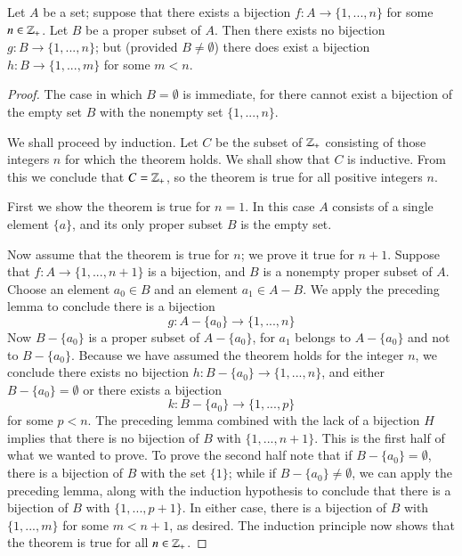 \documentclass[12pt, a4paper, oneside, openright, titlepage]{book}
\begin{document}
\begin{appendices}
    \begin{thm}
        Let $A$ be a set; suppose that there exists a bijection $f:A\rightarrow \{1,...,n\}$ for some $n \in \mathbb Z_+$. Let $B$ be a proper subset of $A$. Then there exists no bijection $g:B\rightarrow \{1,...,n\}$; but (provided $B\neq \emptyset$) there does exist a bijection $h:B\rightarrow \{1,...,m\}$ for some $m < n$.
    \end{thm}
    \begin{proof}
        The case in which $B = \emptyset$ is immediate, for there cannot exist a bijection of the empty set $B$ with the nonempty set $\{1,...,n\}$.


        We shall proceed by induction. Let $C$ be the subset of $\mathbb Z_+$ consisting of those integers $n$ for which the theorem holds. We shall show that $C$ is inductive. From this we conclude that $C = \mathbb Z_+$, so the theorem is true for all positive integers $n$.

        First we show the theorem is true for $n = 1$. In this case $A$ consists of a single element $\{a\}$, and its only proper subset $B$ is the empty set.

        Now assume that the theorem is true for $n$; we prove it true for $n+1$. Suppose that $f:A\rightarrow \{1,...,n+1\}$ is a bijection, and $B$ is a nonempty proper subset of $A$. Choose an element $a_0 \in B$ and an element $a_1 \in A-B$. We apply the preceding lemma to conclude there is a bijection \begin{equation*}
            g:A-\{a_0\}\rightarrow \{1,...,n\}
        \end{equation*}
        Now $B - \{a_0\}$ is a proper subset of $A - \{a_0\}$, for $a_1$ belongs to $A-\{a_0\}$ and not to $B-\{a_0\}$. Because we have assumed the theorem holds for the integer $n$, we conclude there exists no bijection $h:B-\{a_0\}\rightarrow \{1,...,n\}$, and either $B-\{a_0\} = \emptyset$ or there exists a bijection \begin{equation*}
            k:B-\{a_0\}\rightarrow \{1,...,p\}
        \end{equation*}
        for some $p<n$. The preceding lemma combined with the lack of a bijection $H$ implies that there is no bijection of $B$ with $\{1,...,n+1\}$. This is the first half of what we wanted to prove. To prove the second half note that if $B - \{a_0\} = \emptyset$, there is a bijection of $B$ with the set $\{1\}$; while if $B-\{a_0\} \neq \emptyset$, we can apply the preceding lemma, along with the induction hypothesis to conclude that there is a bijection of $B$ with $\{1,...,p+1\}$. In either case, there is a bijection of $B$ with $\{1,...,m\}$ for some $m < n+1$, as desired. The induction principle now shows that the theorem is true for all $n \in \mathbb Z_+$.
    \end{proof}


\end{appendices}
\end{document}
